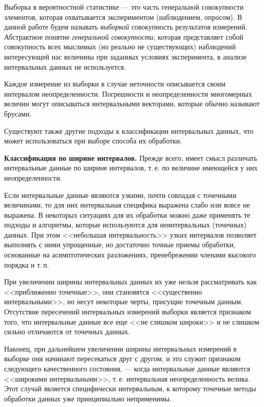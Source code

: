 \documentclass[a5paper,openany]{book}
\begin{document}
{{Выборка в вероятностной статистике --- это часть генеральной совокупности элементов, которая охватывается экспериментом (наблюдением, опросом). 
В данной работе будем называть \textit{выборкой}  
совокупность результатов измерений. Абстрактное понятие \emph{генеральной совокупности}, 
которая представляет собой совокупность всех мыслимых (но реально не существующих) 
наблюдений интересующей нас величины при заданных условиях эксперимента, в анализе 
интервальных данных не используется.  

Каждое измерение из выборки в случае неточности описывается своим интервалом 
неопределенности. Погрешности и неопределенности многомерных величин могут описываться 
интервальными векторами, которые обычно называют брусами. 

Существуют также другие подходы к классификации интервальных данных, что может использоваться при выборе способа их обработки. 

{\bf Классификация по ширине интервалов.}  \label{InteWidClass}
Прежде всего, имеет смысл различать интервальные данные по ширине интервалов, 
т.\,е. по величине имеющейся у них неопределенности. 

Если интервальные данные являются узкими, почти совпадая 
с точечными величинами, то для них интервальная специфика выражена слабо или вовсе 
не выражена. В некоторых ситуациях для их обработки можно даже применять те подходы 
и алгоритмы, которые используются для неинтервальных (точечных) данных. При этом 
<<небольшая интервальность>> узких интервалов позволяет выполнять с ними упрощенные, но 
достаточно точные приемы обработки, основанные на асимптотических разложениях, пренебрежении 
членами высокого порядка и т.\,п. 

При увеличении ширины интервальных данных их  уже нельзя рассматривать как 
<<приближенно точечные>>, они становятся <<существенно интервальными>>,  
но несут некоторые черты, присущие точечным данным. Отсутствие пересечений интервальных измерений выборки является признаком того, что интервальные данные все еще <<не слишком широки>> и не слишком сильно отличаются от точечных данных. 

Наконец, при дальнейшем увеличении ширины интервальных измерений в выборке они начинают 
пересекаться друг с другом, и это служит признаком следующего качественного состояния, 
--- когда интервальные данные являются <<широкими интервальными>>, т.\,е. интервальная 
неопределенность велика. Этот случай является специфически интервальным, к которому 
точечные методы обработки данных уже принципиально неприменимы. 

}}
\end{document}
